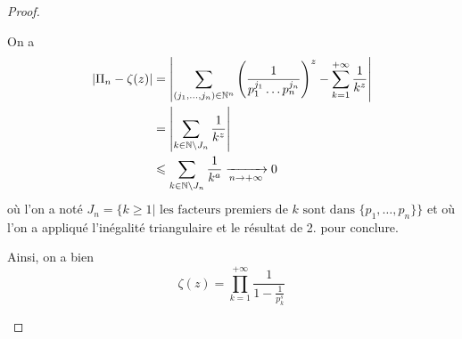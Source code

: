 \begin{proof}
\begin{enumerate}
		On a 
		\begin{align}
			\left\vert\Pi_{n}-\zeta(z)\right\vert
			&=\left\vert\sum_{(j_{1},\dots,j_{n})\in\mathbb{N}^{n}}\left(\frac{1}{p_{1}^{j_{1}}\dots p_{n}^{j_{n}}}\right)^{z}-\sum_{k=1}^{+\infty}\frac{1}{k^{z}}\right\vert\\
			&=\left\vert\sum_{k\in\mathbb{N}\setminus J_{n}}\frac{1}{k^{z}}\right\vert\\
			&\leqslant \sum_{k\in\mathbb{N}\setminus J_{n}}\frac{1}{k^{a}}\xrightarrow[n\to+\infty]{}0
		\end{align}
		où l'on a noté $J_{n}=\{k\geqslant 1|\text{ les facteurs premiers de }k\text{ sont dans }\{p_{1},\dots,p_{n}\}\}$ et où l'on a appliqué l'inégalité triangulaire et le résultat de 2. pour conclure.

		Ainsi, on a bien 
		\begin{equation}\boxed{\zeta(z)=\prod_{k=1}^{+\infty}\frac{1}{1-\frac{1}{p_{k}^{s}}}}\end{equation}
	\end{enumerate}
\end{proof}

